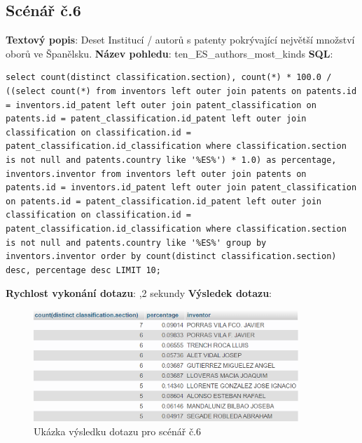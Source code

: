 \newpage
\subsection{Scénář č.6}
\textbf{Textový popis}: Deset Institucí / autorů s patenty pokrývající největší množství oborů ve Španělsku.
\newline
\textbf{Název pohledu}: ten\_ES\_authors\_most\_kinds
\newline
\textbf{SQL}: 
\begin{lstlisting}[label = {lst:elements_a}]
select count(distinct classification.section), count(*) * 100.0 / ((select count(*) from inventors left outer join patents on patents.id = inventors.id_patent left outer join patent_classification on patents.id = patent_classification.id_patent left outer join classification on classification.id = patent_classification.id_classification where classification.section is not null and patents.country like '%ES%') * 1.0) as percentage, inventors.inventor from inventors left outer join patents on patents.id = inventors.id_patent left outer join patent_classification on patents.id = patent_classification.id_patent left outer join classification on classification.id = patent_classification.id_classification where classification.section is not null and patents.country like '%ES%' group by inventors.inventor order by count(distinct classification.section) desc, percentage desc LIMIT 10;
\end{lstlisting}
\textbf{Rychlost vykonání dotazu}: ,2 sekundy
\newline
\textbf{Výsledek dotazu}:
\begin{figure}[H]
\centering
\includegraphics[width=10cm]{img/scenare/scenar_6}
\caption{Ukázka výsledku dotazu pro scénář č.6}
\label{fig:scenar6}
\end{figure}

\newpage
